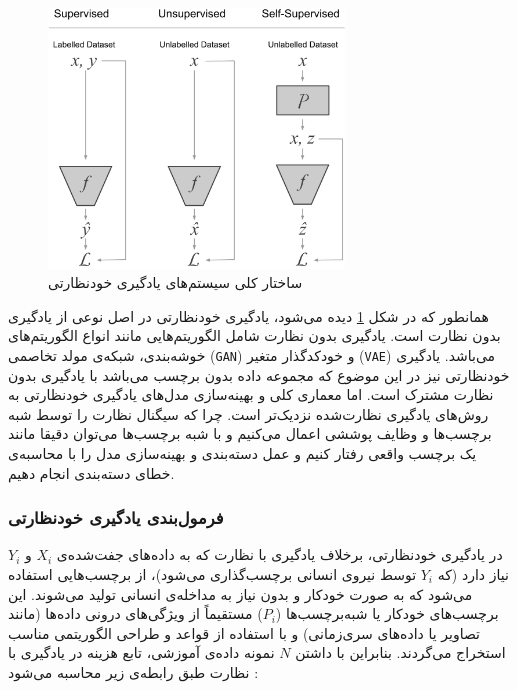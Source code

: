 \begin{figure}[htbp]
  \centering
  \includegraphics[width=0.7\textwidth]{Images/Chapter2/self-vs-unsupervised.png}
  \caption{ساختار کلی سیستم‌های یادگیری خودنظارتی}
  \label{fig:self-vs-unsupervised}
\end{figure}

همانطور که در شکل \ref{fig:self-vs-unsupervised}
دیده می‌شود، یادگیری خودنظارتی در اصل نوعی از یادگیری بدون نظارت است\cite{ericsson2022self}.
یادگیری بدون نظارت شامل الگوریتم‌هایی مانند انواع
الگوریتم‌های خوشه‌بندی،
شبکه‌ی مولد تخاصمی (\verb|GAN|)
و خودکدگذار متغیر (\verb|VAE|)
می‌باشد. یادگیری خودنظارتی نیز در این موضوع که مجموعه داده بدون برچسب می‌باشد با یادگیری بدون نظارت مشترک است. اما معماری کلی و
بهینه‌سازی
مدل‌های یادگیری خودنظارتی به روش‌های یادگیری نظارت‌شده نزدیک‌تر است. چرا که سیگنال نظارت را توسط شبه برچسب‌ها و وظایف پوششی اعمال می‌کنیم و با شبه برچسب‌ها می‌توان دقیقا مانند یک برچسب واقعی رفتار کنیم و عمل دسته‌بندی و بهینه‌سازی مدل را با محاسبه‌ی خطای دسته‌بندی انجام دهیم.

\subsubsection{فرمول‌بندی یادگیری خودنظارتی}

در یادگیری خودنظارتی، برخلاف یادگیری با نظارت که به داده‌های جفت‌شده‌ی $X_i$ و $Y_i$ نیاز دارد (که $Y_i$ توسط نیروی انسانی برچسب‌گذاری می‌شود)، از برچسب‌هایی استفاده می‌شود که به صورت خودکار و بدون نیاز به مداخله‌ی انسانی تولید می‌شوند. این برچسب‌های خودکار یا شبه‌برچسب‌ها ($P_i$) مستقیماً از ویژگی‌های درونی داده‌ها (مانند تصاویر یا داده‌های سری‌زمانی) و با استفاده از قواعد و طراحی الگوریتمی مناسب استخراج می‌گردند. بنابراین با داشتن $N$ نمونه داده‌ی آموزشی، تابع هزینه در یادگیری با نظارت طبق رابطه‌ی زیر محاسبه می‌شود \cite{jing2020self}:

